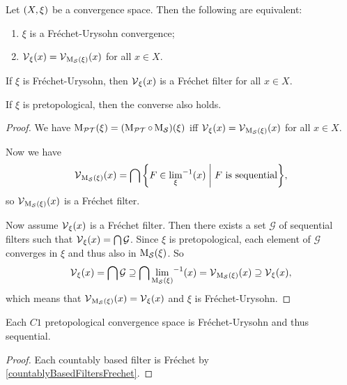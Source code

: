 \begin{proposition}
Let $\left( X,\xi \right)$ be a convergence space. Then the following are equivalent:
\begin{enumerate}
\item $\xi$ is a Fréchet-Urysohn convergence;
\item $\operatorname{\mathcal{V}}_\xi(x) = \operatorname{\mathcal{V}}_{\operatorname{M_\mathcal{S}}(\xi)}(x)$ for all $x\in X$.
\end{enumerate}
If $\xi$ is Fréchet-Urysohn, then $\operatorname{\mathcal{V}}_\xi(x)$ is a Fréchet filter for all $x\in X$.

If $\xi$ is pretopological, then the converse also holds.
\end{proposition}
\begin{proof}
We have $\operatorname{M_\mathcal{PT}}(\xi) = (\operatorname{M_\mathcal{PT}}\circ \operatorname{M_\mathcal{S}})(\xi)$ iff $\operatorname{\mathcal{V}}_\xi(x) = \operatorname{\mathcal{V}}_{\operatorname{M_\mathcal{S}}(\xi)}(x)$ for all $x\in X$.

Now we have
\[ \vicinity_{\seqMod(\xi)}(x) = \bigcap\setbuilder{F\in {\lim_{\xi}}^{-1}(x)}{\text{$F$ is sequential}}, \]
so $\operatorname{\mathcal{V}}_{\operatorname{M_\mathcal{S}}(\xi)}(x)$ is a Fréchet filter.

Now assume $\operatorname{\mathcal{V}}_\xi(x)$ is a Fréchet filter. Then there exists a set $\mathcal{G}$ of sequential filters such that $\operatorname{\mathcal{V}}_\xi(x) = \bigcap \mathcal{G}$. Since $\xi$ is pretopological, each element of $\mathcal{G}$ converges in $\xi$ and thus also in $\operatorname{M_\mathcal{S}}(\xi)$. So
\[ \operatorname{\mathcal{V}}_\xi(x) = \bigcap \mathcal{G} \supseteq \bigcap {\lim_{\operatorname{M_\mathcal{S}}(\xi)}}^{-1}(x) = \operatorname{\mathcal{V}}_{\operatorname{M_\mathcal{S}}(\xi)}(x) \supseteq \operatorname{\mathcal{V}}_{\xi}(x), \]
which means that $\operatorname{\mathcal{V}}_{\operatorname{M_\mathcal{S}}(\xi)}(x) = \operatorname{\mathcal{V}}_{\xi}(x)$ and $\xi$ is Fréchet-Urysohn.
\end{proof}
\begin{corollary}
Each $C1$ pretopological convergence space is Fréchet-Urysohn and thus sequential.
\end{corollary}
\begin{proof}
Each countably based filter is Fréchet by \ref{countablyBasedFiltersFrechet}.
\end{proof}

